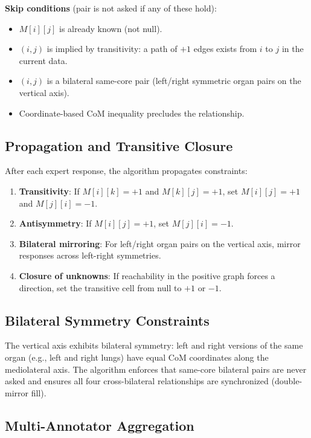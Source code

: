 \documentclass[12pt,a4paper]{article}
\begin{document}
\textbf{Skip conditions} (pair is not asked if any of these hold):
\begin{itemize}
  \item $M[i][j]$ is already known (not null).
  \item $(i, j)$ is implied by transitivity: a path of $+1$ edges exists from $i$ to $j$ in the current data.
  \item $(i, j)$ is a bilateral same-core pair (left/right symmetric organ pairs on the vertical axis).
  \item Coordinate-based CoM inequality precludes the relationship.
\end{itemize}

\subsection{Propagation and Transitive Closure}

After each expert response, the algorithm propagates constraints:

\begin{enumerate}
  \item \textbf{Transitivity}: If $M[i][k] = +1$ and $M[k][j] = +1$, set $M[i][j] = +1$ and $M[j][i] = -1$.
  \item \textbf{Antisymmetry}: If $M[i][j] = +1$, set $M[j][i] = -1$.
  \item \textbf{Bilateral mirroring}: For left/right organ pairs on the vertical axis, mirror responses across left-right symmetries.
  \item \textbf{Closure of unknowns}: If reachability in the positive graph forces a direction, set the transitive cell from null to $+1$ or $-1$.
\end{enumerate}

\subsection{Bilateral Symmetry Constraints}

The vertical axis exhibits bilateral symmetry: left and right versions of the same organ (e.g., left and right lungs) have equal CoM coordinates along the mediolateral axis. The algorithm enforces that same-core bilateral pairs are never asked and ensures all four cross-bilateral relationships are synchronized (double-mirror fill).

\subsection{Multi-Annotator Aggregation}
\end{document}
